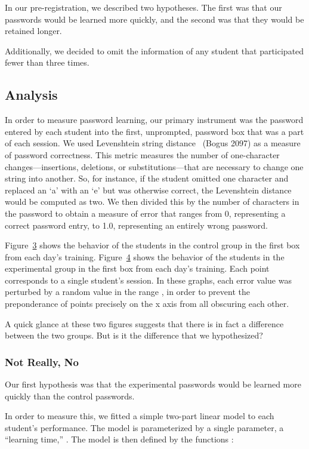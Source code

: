 \documentclass[preprint]{soups}
\let\SOriginalthesubsubsection\thesubsubsection
\newcommand{\Ssubsection}[2]{\subsection[#1]{#2}\let\thesubsubsection\SOriginalthesubsubsection}
\newcommand{\Ssubsubsection}[2]{\subsubsection[#1]{#2}}
\newcommand{\FigureRef}[2]{\hyperref[#2]{#1}}
\begin{document}
In our pre{-}registration, we described two hypotheses. The
first was that our passwords would be learned more quickly,
and the second was that they would be retained longer.

Additionally, we decided to omit the information of any student
that participated fewer than three times.

\Ssubsection{Analysis}{Analysis}\label{t:x28part_x22Analysisx22x29}

In order to measure password learning, our primary
instrument was the password entered by each student into the
first, unprompted, password box that was a part of each
session. We used Levenshtein string distance
~(Bogus 2097) as a measure of password
correctness. This metric measures the number of
one{-}character changes{---}insertions, deletions, or
substitutions{---}that are necessary to change one string into
another. So, for instance, if the student omitted one
character and replaced an {`}a{'} with an {`}e{'} but was otherwise
correct, the Levenshtein distance would be computed as two.
We then divided this by the number of characters in the
password to obtain a measure of error that ranges from 0,
representing a correct password entry, to 1.0, representing
an entirely wrong password.

Figure~\FigureRef{3}{t:x28counter_x28x22figurex22_x22controlx2dseqsx22x29x29} shows the behavior of the
students in the control group in the first box from each
day{'}s training. Figure~\FigureRef{4}{t:x28counter_x28x22figurex22_x22experimentalx2dseqsx22x29x29} shows the behavior of the students in
the experimental group in the first box from each day{'}s
training. Each point corresponds to a single student{'}s
session. In these graphs, each error value was perturbed by
a random value in the range , in order to
prevent the preponderance of points precisely on the x axis
from all obscuring each other.

A quick glance at these two figures suggests that there is in
fact a difference between the two groups. But is it the difference
that we hypothesized?

\Ssubsubsection{Not Really, No}{Not Really, No}\label{t:x28part_x22Notx5fReallyx5fx5fNox22x29}

Our first hypothesis was that the experimental passwords
would be learned more quickly than the control passwords.

In order to measure this, we fitted a simple two{-}part linear
model to each student{'}s performance. The model is parameterized
by a single parameter, a {``}learning time,{''} . The model
is then defined by the functions :
\end{document}
